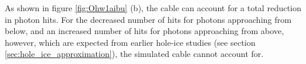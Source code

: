 As shown in figure \ref{fig:Ohw1aibu} (b), the cable can account for a
total reduction in photon hits. For the decreased number of hits for
photons approaching from below, and an increased number of hits for
photons approaching from above, however, which are expected from earlier
hole-ice studies (see section \ref{sec:hole_ice_approximation}), the
simulated cable cannot account for.
